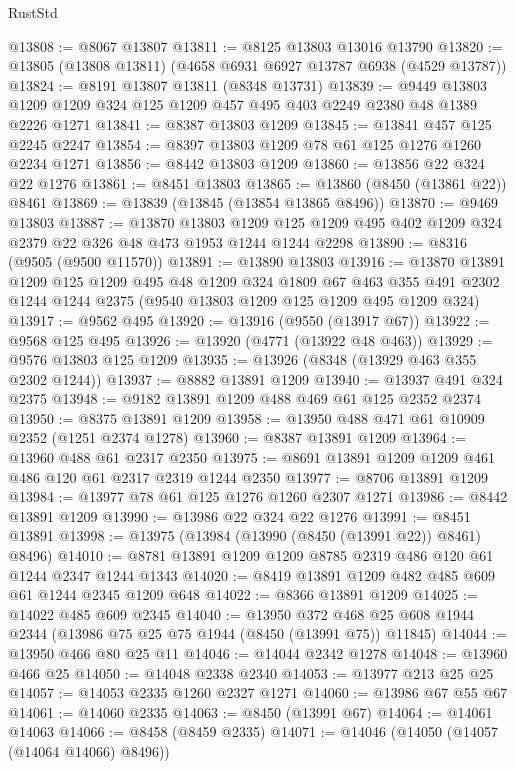 \begin{lexlean}{RustStd}
\begin{coremodule}
@13808 := @8067 @13807
@13811 := @8125 @13803 @13016 @13790
@13820 := @13805 (@13808 @13811) (@4658 @6931 @6927 @13787 @6938 (@4529 @13787))
@13824 := @8191 @13807 @13811 (@8348 @13731)
@13839 := @9449 @13803 @1209 @1209 @324 @125 @1209 @457 @495 @403 @2249 @2380 @48 @1389 @2226 @1271
@13841 := @8387 @13803 @1209
@13845 := @13841 @457 @125 @2245 @2247
@13854 := @8397 @13803 @1209 @78 @61 @125 @1276 @1260 @2234 @1271
@13856 := @8442 @13803 @1209
@13860 := @13856 @22 @324 @22 @1276
@13861 := @8451 @13803
@13865 := @13860 (@8450 (@13861 @22)) @8461
@13869 := @13839 (@13845 (@13854 @13865 @8496))
@13870 := @9469 @13803
@13887 := @13870
    @13803
    @1209
    @125
    @1209
    @495
    @402
    @1209
    @324
    @2379
    @22
    @326
    @48
    @473
    @1953
    @1244
    @1244
    @2298
@13890 := @8316 (@9505 (@9500 @11570))
@13891 := @13890 @13803
@13916 := @13870
    @13891
    @1209
    @125
    @1209
    @495
    @48
    @1209
    @324
    @1809
    @67
    @463
    @355
    @491
    @2302
    @1244
    @1244
    @2375
    (@9540 @13803 @1209 @125 @1209 @495 @1209 @324)
@13917 := @9562 @495
@13920 := @13916 (@9550 (@13917 @67))
@13922 := @9568 @125 @495
@13926 := @13920 (@4771 (@13922 @48 @463))
@13929 := @9576 @13803 @125 @1209
@13935 := @13926 (@8348 (@13929 @463 @355 @2302 @1244))
@13937 := @8882 @13891 @1209
@13940 := @13937 @491 @324 @2375
@13948 := @9182 @13891 @1209 @488 @469 @61 @125 @2352 @2374
@13950 := @8375 @13891 @1209
@13958 := @13950 @488 @471 @61 @10909 @2352 (@1251 @2374 @1278)
@13960 := @8387 @13891 @1209
@13964 := @13960 @488 @61 @2317 @2350
@13975 := @8691 @13891 @1209 @1209 @461 @486 @120 @61 @2317 @2319 @1244 @2350
@13977 := @8706 @13891 @1209
@13984 := @13977 @78 @61 @125 @1276 @1260 @2307 @1271
@13986 := @8442 @13891 @1209
@13990 := @13986 @22 @324 @22 @1276
@13991 := @8451 @13891
@13998 := @13975 (@13984 (@13990 (@8450 (@13991 @22)) @8461) @8496)
@14010 := @8781 @13891 @1209 @1209 @8785 @2319 @486 @120 @61 @1244 @2347 @1244 @1343
@14020 := @8419 @13891 @1209 @482 @485 @609 @61 @1244 @2345 @1209 @648
@14022 := @8366 @13891 @1209
@14025 := @14022 @485 @609 @2345
@14040 := @13950
    @372
    @468
    @25
    @608
    @1944
    @2344
    (@13986 @75 @25 @75 @1944 (@8450 (@13991 @75)) @11845)
@14044 := @13950 @466 @80 @25 @11
@14046 := @14044 @2342 @1278
@14048 := @13960 @466 @25
@14050 := @14048 @2338 @2340
@14053 := @13977 @213 @25 @25
@14057 := @14053 @2335 @1260 @2327 @1271
@14060 := @13986 @67 @55 @67
@14061 := @14060 @2335
@14063 := @8450 (@13991 @67)
@14064 := @14061 @14063
@14066 := @8458 (@8459 @2335)
@14071 := @14046 (@14050 (@14057 (@14064 @14066) @8496))

\end{coremodule}
\end{lexlean}
